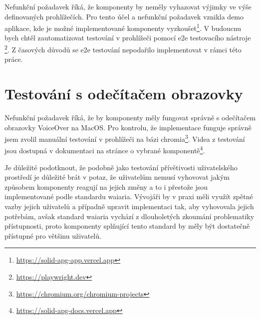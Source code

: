 Nefunkční požadavek \hyperref[nfr11]{} říká, že komponenty by neměly vyhazovat výjimky ve výše definovaných prohlížečích.
Pro tento účel a nefunkční požadavek \hyperref[nfr15]{} vznikla demo aplikace, kde je možné implementované komponenty vyzkoušet\footnote{\url{https://solid-apg-app.vercel.app}}.
V budoucnu bych chtěl zautomatizovat testování v prohlížeči pomocí \gls{e2e} testovacího nástroje \footnote{\url{https://playwright.dev}}.
Z časových důvodů se \gls{e2e} testování nepodařilo implementovat v rámci této práce.

\section{Testování s odečítačem obrazovky}

Nefunkční požadavek \hyperref[nfr12]{} říká, že by komponenty měly fungovat správně s odečítačem obrazovky VoiceOver na MacOS.
Pro kontrolu, že implementace funguje správně jsem zvolil manuální testování v prohlížeči na bázi chromia\footnote{\url{https://chromium.org/chromium-projects}}.
Videa z testování jsou dostupná v dokumentaci na stránce o vybrané komponentě\footnote{\url{https://solid-apg-docs.vercel.app}}.

Je důležité podotknout, že podobně jako testování přívětivosti uživatelského prostředí je důležité brát v potaz, že uživatelům nemusí vyhovovat jakým způsobem komponenty reagují na jejich změny a to i přestože jsou implementované podle standardu \gls{waiaria}.
Vývojáři by v praxi měli využít zpětné vazby jejich uživatelů a případně upravit implementaci tak, aby vyhovovala jejich potřebám, avšak standard \gls{waiaria} vychází z dlouholetých zkoumání problematiky přístupnosti, proto komponenty splňující tento standard by měly být dostatečně přístupné pro většinu uživatelů.
